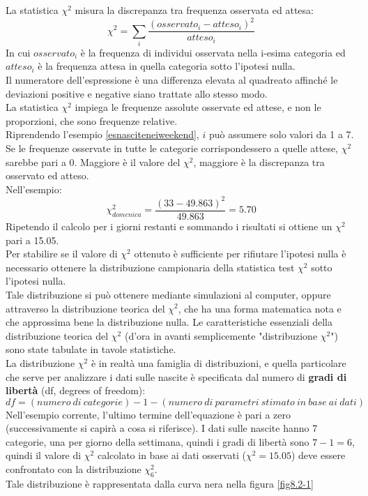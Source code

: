\documentclass[drafts, 10pt]{book}
\begin{document}
La statistica $\chi^2$ misura la discrepanza tra frequenza osservata ed attesa:
\begin{equation}
\chi^2 = \sum_i \frac{(osservato_i - atteso_i)^2}{atteso_i}
\end{equation}
In cui $osservato_i$ è la frequenza di individui osservata nella i-esima categoria ed $atteso_i$ è la frequenza attesa in quella categoria sotto l'ipotesi nulla.
\\
Il numeratore dell'espressione è una differenza elevata al quadreato affinché le deviazioni positive e negative siano trattate allo stesso modo.
\\
La statistica $\chi^2$ impiega le frequenze assolute osservate ed attese, e non le proporzioni, che sono frequenze relative.
\\
Riprendendo l'esempio \ref{esnasciteneiweekend}, $i$ può assumere solo valori da 1 a 7. Se le frequenze osservate in tutte le categorie corrispondessero a quelle attese, $\chi^2$ sarebbe pari a 0. Maggiore è il valore del $\chi^2$, maggiore è la discrepanza tra osservato ed atteso.
\\
Nell'esempio:
\begin{equation}
\chi^2_{domenica} = \frac{(33 - 49.863)^2}{49.863} = 5.70
\end{equation}
Ripetendo il calcolo per i giorni restanti e sommando i risultati si ottiene un $\chi^2$ pari a 15.05.
\\
Per stabilire se il valore di $\chi^2$ ottenuto è sufficiente per rifiutare l'ipotesi nulla è necessario ottenere la distribuzione campionaria della statistica test $\chi^2$ sotto l'ipotesi nulla.
\\
Tale distribuzione si può ottenere mediante simulazioni al computer, oppure attraverso la distribuzione teorica del $\chi^2$, che ha una forma matematica nota e che approssima bene la distribuzione nulla.
Le caratteristiche essenziali della distribuzione teorica del $\chi^2$ (d'ora in avanti semplicemente "distribuzione $\chi^2$") sono state tabulate in tavole statistiche. %
\\
La distribuzione $\chi^2$ è in realtà una famiglia di distribuzioni, e quella particolare che serve per analizzare i dati sulle nascite è specificata dal numero di \textbf{gradi di libertà} (df, degrees of freedom):
\begin{equation}
df = (numero\ di\ categorie) -1 - (numero\ di\ parametri\ stimato\ in\ base\ ai\ dati)
\end{equation}
Nell'esempio corrente, l'ultimo termine dell'equazione è pari a zero (successivamente si capirà a cosa si riferisce). I dati sulle nascite hanno 7 categorie, una per giorno della settimana, quindi i gradi di libertà sono $7-1 = 6$, quindi il valore di $\chi^2$ calcolato in base ai dati osservati ($\chi^2 = 15.05$) deve essere confrontato con la distribuzione $\chi^2_6$.
\\
Tale distribuzione è rappresentata dalla curva nera nella figura \ref{fig8.2-1}
\end{document}
